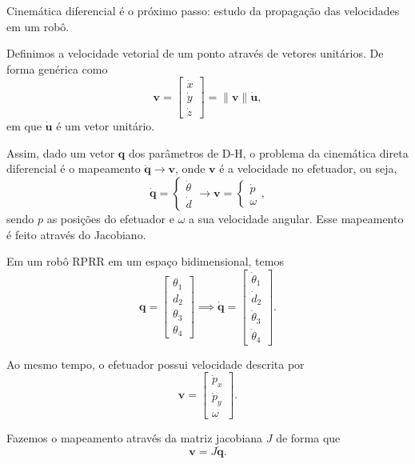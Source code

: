 
Cinemática diferencial é o próximo passo: estudo da propagação das velocidades em um robô.

Definimos a velocidade vetorial de um ponto através de vetores unitários. De forma genérica como \[
\bm{v} = \begin{bmatrix} \dot{x} \\ \dot{y} \\ \dot{z} \end{bmatrix} = \|\bm{v}\|\bm{\dot{u}}
,\] em que $\bm{\dot{u}}$ é um vetor unitário.

Assim, dado um vetor $\bm{q}$ dos parâmetros de D-H, o problema da cinemática direta diferencial é o mapeamento $\bm{\dot{q}} \to \bm{v}$, onde $\bm{v}$ é a velocidade no efetuador, ou seja, \[
\bm{\dot{q}} = \begin{cases}
    \dot{\theta} \\ \dot{d}
\end{cases}  \to \bm{v} = \begin{cases}
    \dot{p} \\ \omega
\end{cases} 
,\] sendo $p$ as posições do efetuador e $\omega$ a sua velocidade angular. Esse mapeamento é feito através do Jacobiano.

\begin{eg}
    Em um robô RPRR em um espaço bidimensional, temos \[
    \bm{q} = \begin{bmatrix} \theta_1 \\ d_2 \\ \theta_3 \\ \theta_4 \end{bmatrix} \implies \dot{\bm{q}} = \begin{bmatrix} \dot{\theta}_1 \\ \dot{d}_2 \\ \dot{\theta}_3 \\ \dot{\theta}_4 \end{bmatrix} 
    .\]

    Ao mesmo tempo, o efetuador possui velocidade descrita por \[
    \bm{v} = \begin{bmatrix} \dot{p}_x \\ \dot{p}_y \\ \omega \end{bmatrix} 
    .\] 

    Fazemos o mapeamento através da matriz jacobiana $J$ de forma que \[
    \bm{v} = J \bm{\dot{q}}
    .\] 
\end{eg}

